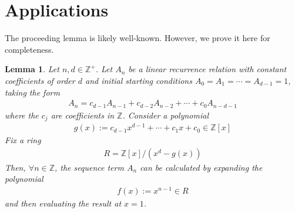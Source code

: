 \documentclass[11pt,reqno]{article}
\theoremstyle{plain}
\newtheorem{lemma}[theorem]{Lemma}
\theoremstyle{definition}
\begin{document}
\section{Applications} \label{section:applications}
The proceeding lemma is likely well-known. However, we prove it here for completeness.

\begin{lemma} \label{lemma:recurrences}
Let $n,d \in \mathbb{Z}^+$. Let $A_n$ be a linear recurrence relation with constant coefficients of order $d$ and initial starting conditions $A_0=A_1=\cdots=A_{d-1}=1$, taking the form
\begin{align*}
    A_{n} = c_{d-1} A_{n-1} + c_{d-2} A_{n-2} + \cdots + c_{0} A_{n-d-1}
\end{align*}
where the $c_j$ are coefficients in $\mathbb{Z}$. Consider a polynomial
\begin{align*}
    g(x) := c_{d-1} x^{d-1} + \cdots + c_1 x + c_0 \in \mathbb{Z}[x]
\end{align*}
Fix a ring
\begin{align*}
    R = \mathbb{Z}[x]/(x^d-g(x))
\end{align*}
Then, $\forall n \in \mathbb{Z}$, the sequence term $A_n$ can be calculated by expanding the polynomial 
\begin{align*}
    f(x) := x^{n-1} \in R
\end{align*}
and then evaluating the result at $x=1$.
\end{lemma}
\end{document}
